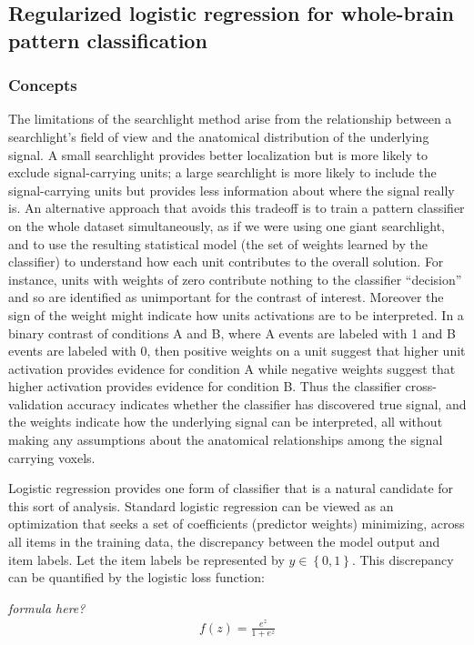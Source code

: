 \subsection{Regularized logistic regression for whole-brain pattern classification}
\subsubsection{Concepts}
The limitations of the searchlight method arise from the relationship between a searchlight's field of view and the anatomical distribution of the underlying signal. A small searchlight provides better localization but is more likely to exclude signal-carrying units; a large searchlight is more likely to include the signal-carrying units but provides less information about where the signal really is. An alternative approach that avoids this tradeoff is to train a pattern classifier on the whole dataset simultaneously, as if we were using one giant searchlight, and to use the resulting statistical model (the set of weights learned by the classifier) to understand how each unit contributes to the overall solution. For instance, units with weights of zero contribute nothing to the classifier ``decision'' and so are identified as unimportant for the contrast of interest. Moreover the sign of the weight might indicate how units activations are to be interpreted. In a binary contrast of conditions A and B, where A events are labeled with 1 and B events are labeled with 0, then positive weights on a unit suggest that higher unit activation provides evidence for condition A while negative weights suggest that higher activation provides evidence for condition B. Thus the classifier cross-validation accuracy indicates whether the classifier has discovered true signal, and the weights indicate how the underlying signal can be interpreted, all without making any assumptions about the anatomical relationships among the signal carrying voxels.

Logistic regression provides one form of classifier that is a natural candidate for this sort of analysis. Standard logistic regression can be viewed as an optimization that seeks a set of coefficients (predictor weights) minimizing, across all items in the training data, the discrepancy between the model output and item labels. Let the item labels be represented by $y\in{\left\{0,1\right\}}$.  This discrepancy can be quantified by the logistic loss function:

{\em  formula here?}
\begin{align}
f(z) = \frac{e^z}{1+e^{z}}
\label{eq.logisticloss}
\end{align}

